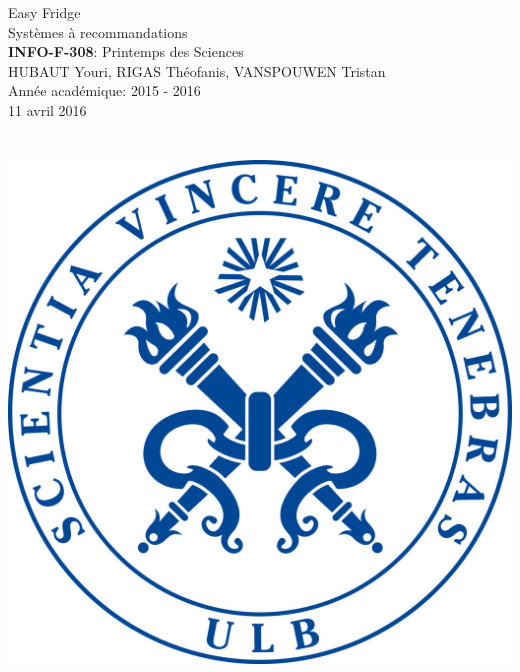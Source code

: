 \documentclass[11pt,a4paper]{report}
\begin{document}

\begin{titlepage}
    \vspace*{\fill}
    \begin{center}
        \huge {Easy Fridge} \\
	    Systèmes à recommandations \\
	    \textbf{INFO-F-308}: Printemps des Sciences \\
	
	    \Large {HUBAUT Youri, RIGAS Théofanis, VANSPOUWEN Tristan}\\
        Année académique: 2015 - 2016\\
	    11 avril 2016 \\
	      \\
	      \\
	    \includegraphics[scale=0.1]{logo_ulb.jpg}
    \end{center}
    \vspace*{\fill}

\end{titlepage}

\newpage

\tableofcontents

\newpage










\end{document}
